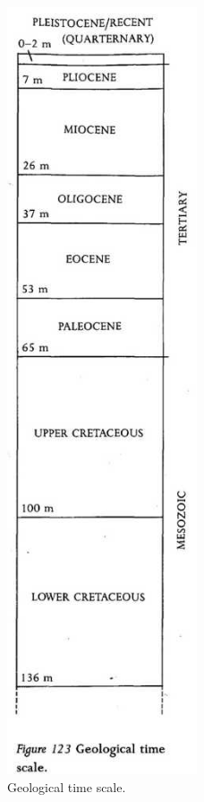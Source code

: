 \begin{figure}
	\includegraphics[width=0.5\textwidth]{graphics/figure123timescale.jpg}
	\centering
	\caption[Geological time scale]{Geological time scale.}%
	\label{fig:123timescale}
\end{figure}

